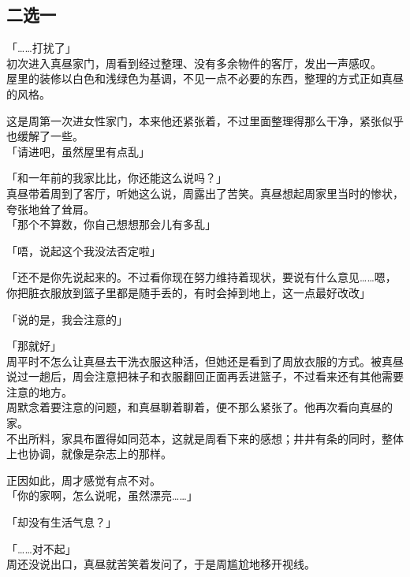 \subsection{二选一}

「……打扰了」\\

初次进入真昼家门，周看到经过整理、没有多余物件的客厅，发出一声感叹。\\

屋里的装修以白色和浅绿色为基调，不见一点不必要的东西，整理的方式正如真昼的风格。

这是周第一次进女性家门，本来他还紧张着，不过里面整理得那么干净，紧张似乎也缓解了一些。\\

「请进吧，虽然屋里有点乱」

「和一年前的我家比比，你还能这么说吗？」\\

真昼带着周到了客厅，听她这么说，周露出了苦笑。真昼想起周家里当时的惨状，夸张地耸了耸肩。\\

「那个不算数，你自己想想那会儿有多乱」

「唔，说起这个我没法否定啦」

「还不是你先说起来的。不过看你现在努力维持着现状，要说有什么意见……嗯，你把脏衣服放到篮子里都是随手丢的，有时会掉到地上，这一点最好改改」

「说的是，我会注意的」

「那就好」\\

周平时不怎么让真昼去干洗衣服这种活，但她还是看到了周放衣服的方式。被真昼说过一趟后，周会注意把袜子和衣服翻回正面再丢进篮子，不过看来还有其他需要注意的地方。\\

周默念着要注意的问题，和真昼聊着聊着，便不那么紧张了。他再次看向真昼的家。\\

不出所料，家具布置得如同范本，这就是周看下来的感想；井井有条的同时，整体上也协调，就像是杂志上的那样。

正因如此，周才感觉有点不对。\\

「你的家啊，怎么说呢，虽然漂亮……」

「却没有生活气息？」

「……对不起」\\

周还没说出口，真昼就苦笑着发问了，于是周尴尬地移开视线。\\


